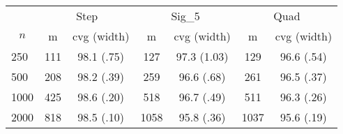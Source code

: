 \begin{tabular}{lcccccc}
   \toprule
 
           & \multicolumn{2}{c}{Step}& \multicolumn{2}{c}{Sig\_5}& \multicolumn{2}{c}{Quad} \\ 
             \cmidrule(l{2pt}r{2pt}){2-3} \cmidrule(l{2pt}r{2pt}){4-5} \cmidrule(l{2pt}r{2pt}){6-7} 
             \multicolumn{1}{c}{$n$} & \multicolumn{1}{c}{m}& \multicolumn{1}{c}{cvg (width)}& \multicolumn{1}{c}{m}& \multicolumn{1}{c}{cvg (width)}& \multicolumn{1}{c}{m}& \multicolumn{1}{c}{cvg (width)} \\ \midrule 
        250 & 111 & 98.1 (.75) & 127 & 97.3 (1.03) & 129 & 96.6 (.54) \\ 
  500 & 208 & 98.2 (.39) & 259 & 96.6 (.68) & 261 & 96.5 (.37) \\ 
  1000 & 425 & 98.6 (.20) & 518 & 96.7 (.49) & 511 & 96.3 (.26) \\ 
  2000 & 818 & 98.5 (.10) & 1058 & 95.8 (.36) & 1037 & 95.6 (.19) \\ 
   \hline
\end{tabular}
